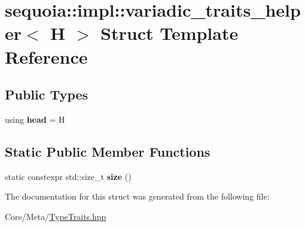 \hypertarget{structsequoia_1_1impl_1_1variadic__traits__helper_3_01_h_01_4}{}\section{sequoia\+::impl\+::variadic\+\_\+traits\+\_\+helper$<$ H $>$ Struct Template Reference}
\label{structsequoia_1_1impl_1_1variadic__traits__helper_3_01_h_01_4}
\subsection*{Public Types}
\begin{DoxyCompactItemize}
\item 
\mbox{\label{structsequoia_1_1impl_1_1variadic__traits__helper_3_01_h_01_4_aed4bf88cbe548a9bb0df73bb0066b4e7}} 
using {\bfseries head} = H
\end{DoxyCompactItemize}
\subsection*{Static Public Member Functions}
\begin{DoxyCompactItemize}
\item 
\mbox{\label{structsequoia_1_1impl_1_1variadic__traits__helper_3_01_h_01_4_a0e7922884c5ced55f28529cb3d5fec61}} 
static constexpr std\+::size\+\_\+t {\bfseries size} ()
\end{DoxyCompactItemize}


The documentation for this struct was generated from the following file\+:\begin{DoxyCompactItemize}
\item 
Core/\+Meta/\mbox{\hyperlink{_type_traits_8hpp}{Type\+Traits.\+hpp}}\end{DoxyCompactItemize}
